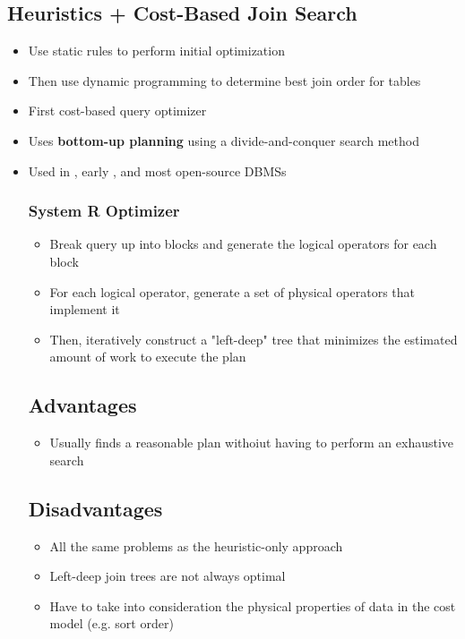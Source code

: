 \documentclass[11pt]{article}
\begin{document}
    \subsection*{Heuristics + Cost-Based Join Search~\cite{p23-selinger}}
    \begin{itemize}
        \item Use static rules to perform initial optimization
        \item Then use dynamic programming to determine best join order for tables
        \item First cost-based query optimizer
        \item Uses \textbf{bottom-up planning} using a divide-and-conquer search method
        \item Used in , early , and most open-source DBMSs

        \subsubsection*{System R Optimizer}
        \begin{itemize}
            \item Break query up into blocks and generate the logical operators for each block
            \item For each logical operator, generate a set of physical operators that implement it
            \item Then, iteratively construct a "left-deep" tree that minimizes the estimated amount of work to execute the plan
        \end{itemize}

        \subsection*{Advantages}
        \begin{itemize}
            \item Usually finds a reasonable plan withoiut having to perform an exhaustive search
        \end{itemize}

        \subsection*{Disadvantages}
        \begin{itemize}
            \item All the same problems as the heuristic-only approach
            \item Left-deep join trees are not always optimal
            \item Have to take into consideration the physical properties of data in the cost model (e.g. sort order)
        \end{itemize}






    \end{itemize}
\end{document}
